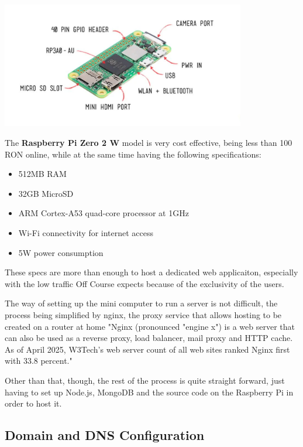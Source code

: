 \documentclass[12pt,a4paper]{report}
\begin{document}
\begin{center}
\includegraphics[width=0.8\textwidth]{images/raspberrypi.png}
\end{center}

The \textbf{Raspberry Pi Zero 2 W} model is very cost effective, being less than 100 RON online, while at the same time having the following specifications:

\begin{itemize}
    \item 512MB RAM
    \item 32GB MicroSD
    \item ARM Cortex-A53 quad-core processor at 1GHz
    \item Wi-Fi connectivity for internet access
    \item 5W power consumption
\end{itemize}

These specs are more than enough to host a dedicated web applicaiton, especially with the low traffic Off Course expects because of the exclusivity of the users.

The way of setting up the mini computer to run a server is not difficult, the process being simplified by nginx, the proxy service that allows hosting to be created on a router at home "Nginx (pronounced "engine x") is a web server that can also be used as a reverse proxy, load balancer, mail proxy and HTTP cache. As of April 2025, W3Tech's web server count of all web sites ranked Nginx first with 33.8 percent."~\cite{nginX}

Other than that, though, the rest of the process is quite straight forward, just having to set up Node.js, MongoDB and the source code on the Raspberry Pi in order to host it.

\subsection{Domain and DNS Configuration}
\end{document}
